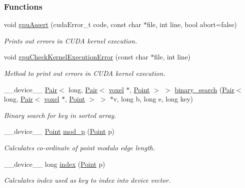 \subsubsection*{Functions}
\begin{DoxyCompactItemize}
\item 
void \hyperlink{Voxel_8cuh_af3f284d9dc439df44497e0e24b6d1fed}{gpu\+Assert} (cuda\+Error\+\_\+t code, const char $\ast$file, int line, bool abort=false)
\begin{DoxyCompactList}\small\item\em Prints out errors in C\+U\+DA kernel execution. \end{DoxyCompactList}\item 
void \hyperlink{Voxel_8cuh_aa881629585a7719857d28b2cbf1e1257}{gpu\+Check\+Kernel\+Execution\+Error} (const char $\ast$file, int line)
\begin{DoxyCompactList}\small\item\em Method to print out errors in C\+U\+DA kernel execution. \end{DoxyCompactList}\item 
\+\_\+\+\_\+device\+\_\+\+\_\+ \hyperlink{classPair}{Pair}$<$ long, \hyperlink{classPair}{Pair}$<$ \hyperlink{classvoxel}{voxel} $\ast$, \hyperlink{structPoint}{Point} $>$ $>$ \hyperlink{Voxel_8cuh_a8af940c50e32ce0514198b2bf835b80c}{binary\+\_\+search} (\hyperlink{classPair}{Pair}$<$ long, \hyperlink{classPair}{Pair}$<$ \hyperlink{classvoxel}{voxel} $\ast$, \hyperlink{structPoint}{Point} $>$ $>$ $\ast$v, long b, long e, long key)
\begin{DoxyCompactList}\small\item\em Binary search for key in sorted array. \end{DoxyCompactList}\item 
\+\_\+\+\_\+device\+\_\+\+\_\+ \hyperlink{structPoint}{Point} \hyperlink{Voxel_8cuh_abbd51b1d8c2bc9b7d5ef5413e1e4ca49}{mod\+\_\+p} (\hyperlink{structPoint}{Point} p)
\begin{DoxyCompactList}\small\item\em Calculates co-\/ordinate of point modulo edge length. \end{DoxyCompactList}\item 
\+\_\+\+\_\+device\+\_\+\+\_\+ long \hyperlink{Voxel_8cuh_afeed91d5a5a0b48801aca2d5edeaf3e1}{index} (\hyperlink{structPoint}{Point} p)
\begin{DoxyCompactList}\small\item\em Calculates index used as key to index into device vector. \end{DoxyCompactList}\item 

\end{DoxyCompactItemize}
